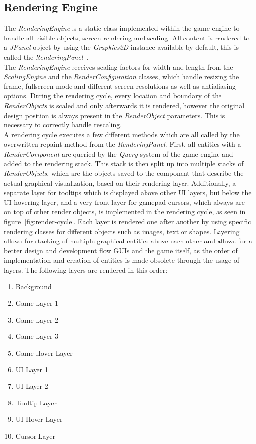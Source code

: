 \subsection{Rendering Engine}\label{subsec:graphics-engine}
The \textit{RenderingEngine} is a static class implemented within the game engine to handle all visible objects, screen rendering and scaling.
All content is rendered to a \textit{JPanel} object by using the \textit{Graphics2D} instance available by default, this is called the \textit{RenderingPanel}~\cite{jpanel,graphics2d}.
\\
The \textit{RenderingEngine} receives scaling factors for width and length from the \textit{ScalingEngine} and the \textit{RenderConfiguration}
classes, which handle resizing the frame,
fullscreen mode and different screen resolutions as well as antialiasing options.
During the rendering cycle, every location and boundary of the \textit{RenderObjects} is scaled and only afterwards it is rendered, however the original design position
is always present in the \textit{RenderObject} parameters.
This is necessary to correctly handle rescaling.
\\
A rendering cycle executes a few different methods which are all called by the overwritten repaint method from the \textit{RenderingPanel}.
First, all entities with a \textit{RenderComponent} are queried by the \textit{Query} system of the game engine and added to the rendering stack.
This stack is then split up into multiple stacks of \textit{RenderObjects}, which are the objects saved to the component that describe the actual
graphical visualization, based on their rendering layer.
Additionally, a separate layer for tooltips which is displayed above other \gls{UI} layers, but below the \gls{UI} hovering layer, and a very
front layer for gamepad cursors, which always are on top of other render objects, is implemented in the rendering cycle, as
seen in figure~\ref{fig:render-cycle}.
Each layer is rendered one after another by using specific rendering classes for different objects such as images, text or shapes.
Layering allows for stacking of multiple graphical entities above each other and allows for a better design and development flow \gls{GUI}s and the game itself,
as the order of implementation and creation of entities is made obsolete through the usage of layers.
The following layers are rendered in this order:
\begin{enumerate}
    \item Background
    \item Game Layer 1
    \item Game Layer 2
    \item Game Layer 3
    \item Game Hover Layer
    \item UI Layer 1
    \item UI Layer 2
    \item Tooltip Layer
    \item UI Hover Layer
    \item Cursor Layer
\end{enumerate}
